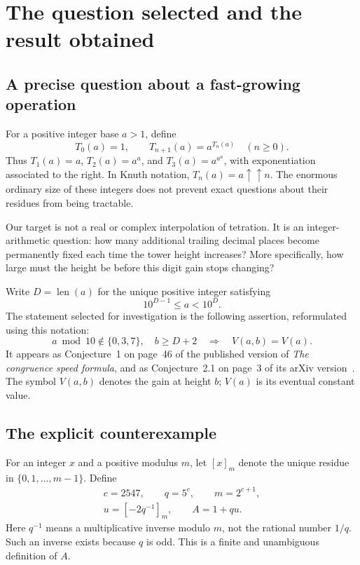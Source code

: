 \documentclass[11pt,a4paper]{article}
\theoremstyle{definition}
\theoremstyle{remark}
\newcommand{\len}{\operatorname{len}}
\newcommand{\res}[2]{\left[#1\right]_{#2}}
\begin{document}
\begingroup
\setlength{\parskip}{0pt}
\small
\tableofcontents
\endgroup
\newpage

\section{The question selected and the result obtained}
\label{sec:question}

\subsection{A precise question about a fast-growing operation}
For a positive integer base $a>1$, define
\begin{equation}\label{eq:tower}
 T_0(a)=1,\qquad T_{n+1}(a)=a^{T_n(a)}\quad(n\ge0).
\end{equation}
Thus $T_1(a)=a$, $T_2(a)=a^a$, and $T_3(a)=a^{a^a}$, with exponentiation associated to the right. In Knuth notation, $T_n(a)=a\uparrow\uparrow n$. The enormous ordinary size of these integers does not prevent exact questions about their residues from being tractable.

Our target is not a real or complex interpolation of tetration. It is an integer-arithmetic question: how many additional trailing decimal places become permanently fixed each time the tower height increases? More specifically, how large must the height be before this digit gain stops changing?

Write $D=\len(a)$ for the unique positive integer satisfying
\[
 10^{D-1}\le a<10^D.
\]
The statement selected for investigation is the following assertion, reformulated using this notation:
\begin{equation}\label{eq:conjecture}
 \boxed{\quad a\bmod10\notin\{0,3,7\},\quad b\ge D+2
 \quad\Longrightarrow\quad V(a,b)=V(a).\quad}
\end{equation}
It appears as Conjecture~1 on page~46 of the published version of \emph{The congruence speed formula}, and as Conjecture~2.1 on page~3 of its arXiv version~\cite{Ripa2021}. The symbol $V(a,b)$ denotes the gain at height $b$; $V(a)$ is its eventual constant value.

\subsection{The explicit counterexample}
For an integer $x$ and a positive modulus $m$, let $[x]_m$ denote the unique residue in $\{0,1,\ldots,m-1\}$. Define
\begin{equation}\label{eq:Adefinition}
 \begin{gathered}
 c=2547,\qquad q=5^c,\qquad m=2^{c+1},\\
 u=\res{-2q^{-1}}{m},\qquad A=1+qu.
 \end{gathered}
\end{equation}
Here $q^{-1}$ means a multiplicative inverse modulo $m$, not the rational number $1/q$. Such an inverse exists because $q$ is odd. This is a finite and unambiguous definition of $A$.
\end{document}
